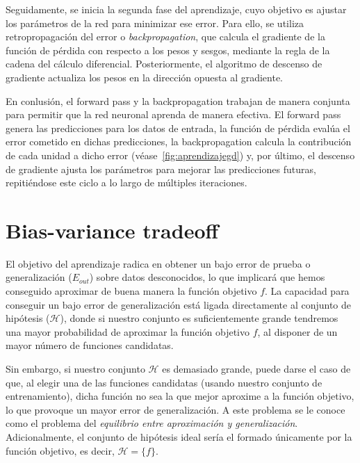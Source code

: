 Seguidamente, se inicia la segunda fase del aprendizaje, cuyo objetivo es ajustar los parámetros de la red para minimizar ese error. Para ello, se utiliza retropropagación del error o \emph{backpropagation}, que calcula el gradiente de la función de pérdida con respecto a los pesos y sesgos, mediante la regla de la cadena del cálculo diferencial. Posteriormente, el algoritmo de descenso de gradiente actualiza los pesos en la dirección opuesta al gradiente.\newline

En conlusión, el forward pass y la backpropagation trabajan de manera conjunta para permitir que la red neuronal aprenda de manera efectiva. El forward pass genera las predicciones para los datos de entrada, la función de pérdida evalúa el error cometido en dichas predicciones, la backpropagation calcula la contribución de cada unidad a dicho error (véase~\autoref{fig:aprendizajegd}) y, por último, el descenso de gradiente ajusta los parámetros para mejorar las predicciones futuras, repitiéndose este ciclo a lo largo de múltiples iteraciones.\newline

\section{Bias-variance tradeoff}\label{sec:capitulo-bias-variance-tradeoff}
El objetivo del aprendizaje radica en obtener un bajo error de prueba o generalización ($E_{out}$) sobre datos desconocidos, lo que implicará que hemos conseguido aproximar de buena manera la función objetivo $f$. La capacidad para conseguir un bajo error de generalización está ligada directamente al conjunto de hipótesis ($\mathcal{H}$), donde si nuestro conjunto es suficientemente grande tendremos una mayor probabilidad de aproximar la función objetivo $f$, al disponer de un mayor número de funciones candidatas.\newline

Sin embargo, si nuestro conjunto $\mathcal{H}$ es demasiado grande, puede darse el caso de que, al elegir una de las funciones candidatas (usando nuestro conjunto de entrenamiento), dicha función no sea la que mejor aproxime a la función objetivo, lo que provoque un mayor error de generalización. A este problema se le conoce como el problema del \textit{equilibrio entre aproximación y generalización}. Adicionalmente, el conjunto de hipótesis ideal sería el formado únicamente por la función objetivo, es decir, $\mathcal{H} = \{f\}$.\newline


